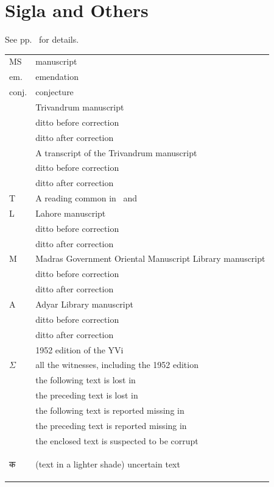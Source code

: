 \section{Sigla and Others}
See pp.~\pageref{sec:symbols} for details.
\setlength\LTleft{0pt}
\setlength\LTright{0pt}
\begin{longtable}{@{}ll@{}}
	MS & manuscript \\
	em. & emendation \\
	conj. & conjecture \\
	\Tm & Trivandrum manuscript \\
	\Tmac & ditto before correction \\
	\Tmpc & ditto after correction \\
	\Td & A transcript of the Trivandrum manuscript \\
	\Tdac & ditto before correction \\
	\Tdpc & ditto after correction \\
	T & A reading common in \Tm\ and \Td \\
	L & Lahore manuscript \\
	\Lac & ditto before correction \\
	\Lpc & ditto after correction \\
	M & Madras Government Oriental Manuscript Library manuscript \\
	\Mac & ditto before correction \\
	\Mpc & ditto after correction \\
	A & Adyar Library manuscript \\
	\Aac & ditto before correction \\
	\Apc & ditto after correction \\
	\Me & 1952 edition of the YVi \\
	$\Sigma$ & all the witnesses, including the 1952 edition \\
	\mms & the following text is lost in \Tm \\
	\kern 5.3pt \mme & the preceding text is lost in \Tm\\
	\raisebox{-0.5ex}{\mds} & the following text is reported missing in \Td \\
	\raisebox{-0.5ex}{\kern 5.3pt \mde} & the preceding text is reported missing in \Td \\
	\dag & the enclosed text is suspected to be corrupt \\
	\begin{uncertain}{\dn क}\end{uncertain} & (text in a lighter shade) uncertain text \\

\end{longtable}
